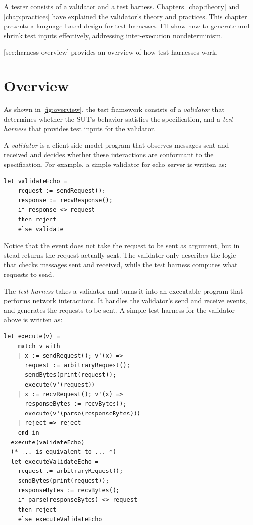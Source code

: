 A tester consists of a validator and a test harness.  Chapters~\ref{chap:theory}
and \ref{chap:practices} have explained the validator's theory and practices.
This chapter presents a language-based design for test harnesses.  I'll show how
to generate and shrink test inputs effectively, addressing inter-execution
nondeterminism.


\autoref{sec:harness-overview} provides an overview of how test harnesses work.



\section{Overview}
\label{sec:harness-overview}




As shown in \autoref{fig:overview}, the test framework consists of a {\em
  validator} that determines whether the SUT's behavior satisfies the
specification, and a {\em test harness} that provides test inputs for the
validator.

A {\em validator} is a client-side model program that observes messages sent and
received and decides whether these interactions are conformant to the
specification.  For example, a simple validator for echo server is written as:
\begin{lstlisting}[style=customcoq]
  let validateEcho =
    request := sendRequest();
    response := recvResponse();
    if response <> request
    then reject
    else validate
\end{lstlisting}
Notice that the  event does not take the request to be sent as
argument, but in stead returns the request actually sent.  The validator only
describes the logic that checks messages sent and received, while the test
harness computes what requests to send.

The {\em test harness} takes a validator and turns it into an executable program
that performs network interactions.  It handles the validator's send and receive
events, and generates the requests to be sent.  A simple test harness for the
validator above is written as:
\begin{lstlisting}[style=customcoq]
  let execute(v) =
    match v with
    | x := sendRequest(); v'(x) =>
      request := arbitraryRequest();
      sendBytes(print(request));
      execute(v'(request))
    | x := recvRequest(); v'(x) =>
      responseBytes := recvBytes();
      execute(v'(parse(responseBytes)))
    | reject => reject
    end in
  execute(validateEcho)
  (* ... is equivalent to ... *)
  let executeValidateEcho =
    request := arbitraryRequest();
    sendBytes(print(request));
    responseBytes := recvBytes();
    if parse(responseBytes) <> request
    then reject
    else executeValidateEcho
\end{lstlisting}

